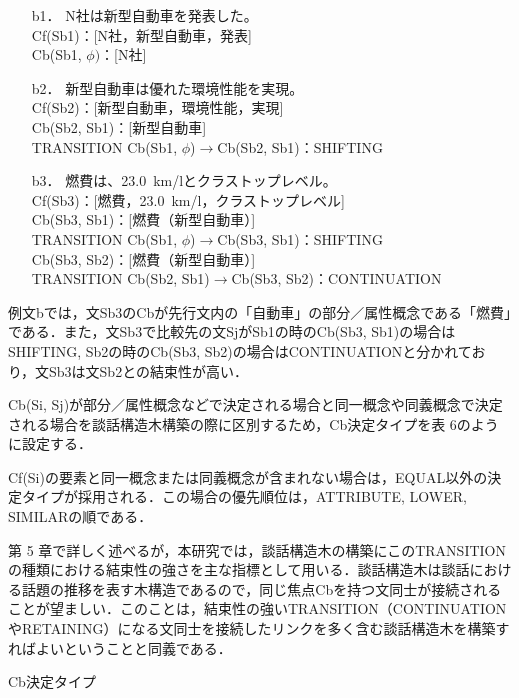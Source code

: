 \documentclass[japanese]{jnlp_1.4}
\begin{document}
\begin{itemize}
\item[b1．]
N社は新型自動車を発表した。\\
Cf(Sb1)：[N社，新型自動車，発表]\\
Cb(Sb1, $\phi)$：[N社]

\item[b2．]
新型自動車は優れた環境性能を実現。\\
Cf(Sb2)：[新型自動車，環境性能，実現]\\
Cb(Sb2, Sb1)：[新型自動車] \\
TRANSITION Cb(Sb1, $\phi$)$\to $Cb(Sb2, Sb1)：SHIFTING

\item[b3．]
燃費は、23.0~km/lとクラストップレベル。\\
Cf(Sb3)：[燃費，23.0~km/l，クラストップレベル]\\
Cb(Sb3, Sb1)：[燃費（新型自動車）] \\
TRANSITION Cb(Sb1, $\phi$)$\to $Cb(Sb3, Sb1)：SHIFTING\\
Cb(Sb3, Sb2)：[燃費（新型自動車）] \\
TRANSITION Cb(Sb2, Sb1)$\to $Cb(Sb3, Sb2)：CONTINUATION
\end{itemize}
\vspace{1\baselineskip}

例文bでは，文Sb3のCbが先行文内の「自動車」の部分／属性概念である「燃費」である．また，文Sb3で比較先の文SjがSb1の時のCb(Sb3, Sb1)の場合はSHIFTING, Sb2の時のCb(Sb3, Sb2)の場合はCONTINUATIONと分かれており，文Sb3は文Sb2との結束性が高い．

Cb(Si, Sj)が部分／属性概念などで決定される場合と同一概念や同義概念で決定される場合を談話構造木構築の際に区別するため，Cb決定タイプを表 
6のように設定する．

Cf(Si)の要素と同一概念または同義概念が含まれない場合は，EQUAL以外の決定タイプが採用される．この場合の優先順位は，ATTRIBUTE, LOWER, SIMILARの順である．

第 5 章で詳しく述べるが，本研究では，談話構造木の構築にこのTRANSITIONの種類における結束性の強さを主な指標として用いる．談話構造木は談話における話題の推移を表す木構造であるので，同じ焦点Cbを持つ文同士が接続されることが望ましい．このことは，結束性の強いTRANSITION（CONTINUATIONやRETAINING）になる文同士を接続したリンクを多く含む談話構造木を構築すればよいということと同義である．

\begin{table}[t]
\caption{Cb決定タイプ}

\end{table}
\end{document}
